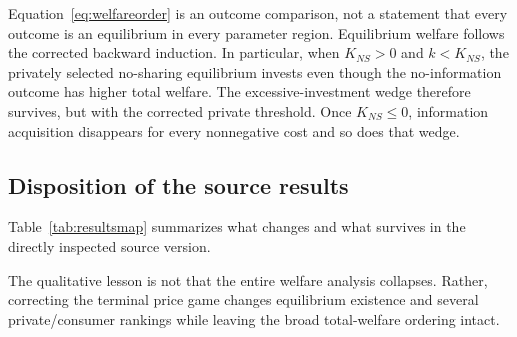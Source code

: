 Equation~\eqref{eq:welfareorder} is an outcome comparison, not a statement that every outcome is an equilibrium in every parameter region.  Equilibrium welfare follows the corrected backward induction.  In particular, when \(K_{NS}>0\) and \(k<K_{NS}\), the privately selected no-sharing equilibrium invests even though the no-information outcome has higher total welfare.  The excessive-investment wedge therefore survives, but with the corrected private threshold.  Once \(K_{NS}\le0\), information acquisition disappears for every nonnegative cost and so does that wedge.

\subsection{Disposition of the source results}

Table~\ref{tab:resultsmap} summarizes what changes and what survives in the directly inspected source version.

\begin{table}[t]
\centering
\caption{Frozen disposition of source Results 1--10}
\label{tab:resultsmap}

\end{table}

The qualitative lesson is not that the entire welfare analysis collapses.  Rather, correcting the terminal price game changes equilibrium existence and several private/consumer rankings while leaving the broad total-welfare ordering intact.
